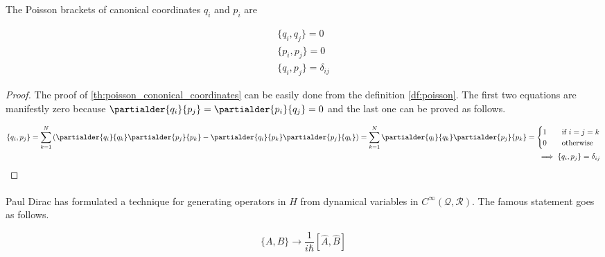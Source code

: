 \begin{theorem}
    \label{th:poisson_cononical_coordinates}
    The Poisson brackets of canonical coordinates $q_{i}$ and $p_{i}$ are

    \begin{equation}
        \begin{gathered}
        \{q_{i}, q_{j}\} = 0 \\
        \{p_{i}, p_{j}\} = 0 \\
        \{q_{i}, p_{j}\} = \delta_{ij}
        \end{gathered}
    \end{equation}
\end{theorem}

\begin{proof}
    The proof of \ref{th:poisson_cononical_coordinates} can be easily done from the definition \ref{df:poisson}. 
    The first two equations are manifestly zero because $\partialder{q_{i}}{p_{j}} = \partialder{p_{i}}{q_{j}} = 0$
    and the last one can be proved as follows.

    \begin{equation}
        \begin{split}
            \{q_{i}, p_{j}\} = \sum_{k=1}^{N}\left(\partialder{q_{i}}{q_{k}} \partialder{p_{j}}{p_{k}} - \partialder{q_{i}}{p_{k}} \partialder{p_{j}}{q_{k}}\right) 
            = \sum_{k=1}^{N} \partialder{q_{i}}{q_{k}} \partialder{p_{j}}{p_{k}} = 
            \begin{cases}
                1  & \quad \text{if } i = j = k \\
                0  & \quad \text{otherwise}
            \end{cases} \\
            \implies \{q_{i}, p_{j}\} = \delta_{ij}
        \end{split}
    \end{equation}
\end{proof}

\paragraph{} Paul Dirac has formulated a technique for generating operators in $H$ from dynamical variables in $C^{\infty}(\mathcal{Q}, \mathcal{R})$. 
The famous statement goes as follows.

\begin{equation}
    \label{eq:dirac_quantization}
    \{A, B\} \to \frac{1}{i \hbar}[\hat{A}, \hat{B}]
\end{equation}

